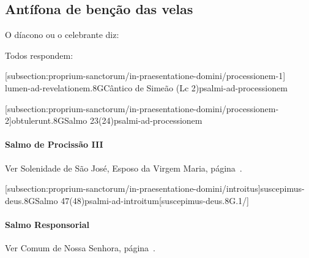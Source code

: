 \def\Prefix{subsection:proprium-sanctorum/in-praesentatione-domini}

\subsection{Antífona de benção das velas}\label{\Prefix/benedictionem-candelarum}

\begin{rubrica}
  \begin{center}
    O díacono ou o celebrante diz:
  \end{center}
\end{rubrica}


\begin{rubrica}
  \begin{center}
    Todos respondem:
  \end{center}
\end{rubrica}


\AllowPageFlush

[\Prefix/processionem-1]
{lumen-ad-revelationem.8G}{Cântico de Simeão (Lc 2)}{psalmi-ad-processionem}

\AllowPageFlush

[\Prefix/processionem-2]{obtulerunt.8G}{Salmo 23(24)}{psalmi-ad-processionem}

\paragraph{Salmo de Procissão III}
\begin{rubrica}
  Ver Solenidade de São José, Esposo da Virgem Maria, página~\pageref{subsection:proprium-sanctorum/sancti-ioseph-sponsi-bmv/psalmus-responsorius}.
\end{rubrica}

\AllowPageFlush

[\Prefix/introitus]{suscepimus-deus.8G}{Salmo 47(48)}{psalmi-ad-introitum}[suscepimus-deus.8G.1/]

\paragraph{Salmo Responsorial}
\begin{rubrica}
  Ver Comum de Nossa Senhora, página~\pageref{subsection:communia/commune-bmv/psalmus-responsorius}.
\end{rubrica}

